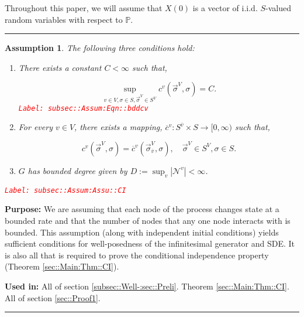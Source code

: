 \documentclass[12pt]{article}
\newcommand{\mb}{\mathbb}
\newcommand{\mc}{\mathcal}
\newcommand{\ra}{\rightarrow}
\newcommand{\ov}{\overline}
\newcommand{\tr}{\textcolor{red}}
\newcommand{\labe}[1]{\tr{\texttt{Label: #1}}}
\newcommand{\purpose}{\textbf{Purpose: }}
\newcommand{\usein}{\textbf{Used in: }}
\newcommand{\lin}{\rule{\linewidth}{0.4 pt}}
\newcommand{\pr}{\mb{P}}							%
\newcommand{\defeq}{:=}								%
\renewcommand{\v}{v}							%
\renewcommand{\S}{S}							%
\newcommand{\s}{\sigma}							%
\newcommand{\sv}{\vec{\s}}						%
\newcommand{\X}{X}								%
\newcommand{\IGr}{c}							%
\newcommand{\neigh}{\mc{N}}						%
\newcommand{\vind}[1]{^{#1}}					%
\newcommand{\carp}[1]{^{#1}}					%
\newcommand{\vsi}[1]{^{#1}}						%
\newcommand{\cind}[1]{_{#1}}					%
\newcommand{\cl}{\ov}							%
\newcommand{\tp}[1]{(#1)}						%
\newcommand{\const}{C}							%
\newcommand{\degr}{D}							%
\newcommand{\IGrg}{\ov{c}}						%
\newtheorem{assu}[thms]{Assumption}
\begin{document}
Throughout this paper, we will assume that \(\X\tp{0}\) is a vector of i.i.d. \(\S\)-valued random variables with respect to \(\pr\).

\lin

\begin{assu}
The following three conditions hold:
\begin{enumerate}
\item There exists a constant \(\const < \infty\) such that,

\begin{equation}
\sup_{\v\in V,\s \in \S,\sv\vsi{V}\in \S\carp{V}} \IGr\vind{\v}(\sv\vsi{V},\s) = \const.
\label{subsec::Assum:Eqn::bddcv}
\end{equation}
\labe{subsec::Assum:Eqn::bddcv}

\item For every \(\v\in V\), there exists a mapping, \(\IGrg\vind{\v}:\S\carp{\cl{\v}} \times \S \ra [0,\infty)\) such that,

\[\IGr\vind{\v}(\sv\vsi{V},\s) = \IGrg\vind{\v}(\sv\cind{\cl{\v}}\vsi{V},\s), \quad \sv\vsi{V} \in \S\carp{V},\s\in \S.\]

\item \(G\) has bounded degree given by \(\degr \defeq \sup_\v |\neigh\vind{\v}| < \infty\).
\end{enumerate}
\label{subsec::Assum:Assu::CI}\labe{subsec::Assum:Assu::CI}
\end{assu}

\purpose We are assuming that each node of the process changes state at a bounded rate and that the number of nodes that any one node interacts with is bounded. This assumption (along with independent initial conditions) yields sufficient conditions for well-posedness of the infinitesimal generator and SDE. It is also all that is required to prove the conditional independence property (Theorem \ref{sec::Main:Thm::CI}). 

\usein All of section \ref{subsec::Well-:sec::Preli}. Theorem \ref{sec::Main:Thm::CI}. All of section \ref{sec::Proof1}.

\lin
\end{document}
